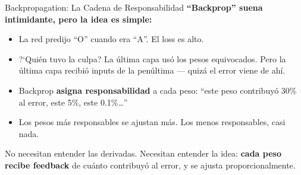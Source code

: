 \documentclass[aspectratio=169, 11pt]{beamer}
\begin{document}
\begin{frame}{Backpropagation: La Cadena de Responsabilidad}
  \vspace{-4pt}
  {\footnotesize\color{arcaDark}\bfseries
    ``Backprop'' suena intimidante, pero la idea es simple:}

  \vspace{6pt}
  {\footnotesize
  \begin{itemize}\setlength{\itemsep}{5pt}
    \item[{\color{arcaRed}\scriptsize\faArrowRight}]
      La red predijo ``O'' cuando era ``A''. El loss es alto.
    \item[{\color{arcaRed}\scriptsize\faArrowRight}]
      ?`Qui\'en tuvo la culpa? La \'ultima capa us\'o los pesos
      equivocados. Pero la \'ultima capa recibi\'o inputs de la
      pen\'ultima --- quiz\'a el error viene de ah\'i.
    \item[{\color{arcaRed}\scriptsize\faArrowRight}]
      Backprop \textbf{asigna responsabilidad} a cada peso:
      ``este peso contribuy\'o 30\% al error, este 5\%, este 0.1\%\ldots''
    \item[{\color{codeGreen}\scriptsize\faArrowRight}]
      Los pesos m\'as responsables se ajustan m\'as. Los menos
      responsables, casi nada.
  \end{itemize}
  }

  \vspace{4pt}
  \begin{tcolorbox}[colback=arcaGray, colframe=arcaRed, boxrule=0.5pt, arc=2pt,
    left=6pt, right=6pt, top=4pt, bottom=4pt]
    {\scriptsize\color{arcaDark}
    \faKey\hspace{4pt} No necesitan entender las derivadas. Necesitan
    entender la idea: \textbf{cada peso recibe feedback} de cu\'anto
    contribuy\'o al error, y se ajusta proporcionalmente.}
  \end{tcolorbox}
\end{frame}
\end{document}
